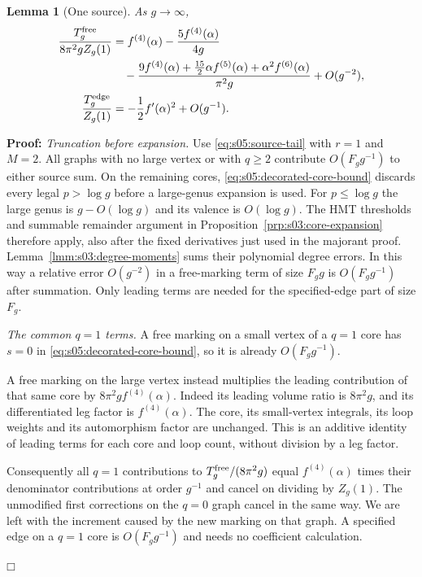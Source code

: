 \documentclass[a4paper,10pt]{article}
\numberwithin{equation}{section}
\theoremstyle{paperplain}
\newtheorem{lmm}[thm]{Lemma}
\theoremstyle{paperremark}
\theoremstyle{paperplain}
\newenvironment{prf}{\noindent \textbf{Proof: }}{\hfill $\mdlgwhtsquare$\par\addvspace{0.5\baselineskip}}
\begin{document}
\begin{lmm}[One source]\label{lmm:s05:single-source}
As $g\to\infty$,
\begin{align}
 \frac{T_g^{\rm free}}{8\pi^2gZ_g(1)}
 &=f^{(4)}(\alpha)-\frac{5f^{(4)}(\alpha)}{4g}\notag\\
 &\quad-\frac{9f^{(4)}(\alpha)
          +\tfrac{15}{2}\alpha f^{(5)}(\alpha)
          +\alpha^2 f^{(6)}(\alpha)}{\pi^2g}
          +O(g^{-2}),
 \label{eq:s05:free-ratio}\\
 \frac{T_g^{\rm edge}}{Z_g(1)}
 &=-\frac12 f'(\alpha)^2+O(g^{-1}).
 \label{eq:s05:edge-ratio}
\end{align}
\end{lmm}
\begin{prf}
\emph{Truncation before expansion.}
Use \eqref{eq:s05:source-tail} with $r=1$ and $M=2$.
All graphs with no large vertex or with $q\geq2$ contribute
$O(F_g g^{-1})$ to either source sum. On the remaining cores,
\eqref{eq:s05:decorated-core-bound} discards every legal
$p>\log g$ before a large-genus expansion is used. For
$p\leq\log g$ the large genus is $g-O(\log g)$ and its valence is
$O(\log g)$. The HMT thresholds and summable remainder argument in
Proposition~\ref{prp:s03:core-expansion} therefore apply, also after
the fixed derivatives just used in the majorant proof.
Lemma~\ref{lmm:s03:degree-moments} sums their polynomial degree
errors. In this way a relative error $O(g^{-2})$ in a free-marking
term of size $F_g g$ is $O(F_g g^{-1})$ after summation. Only leading
terms are needed for the specified-edge part of size $F_g$.

\emph{The common $q=1$ terms.}
A free marking on a small vertex of a $q=1$ core has $s=0$ in
\eqref{eq:s05:decorated-core-bound}, so it is already
$O(F_g g^{-1})$.

A free marking on the large vertex instead
multiplies the leading contribution of that same core by
$8\pi^2g f^{(4)}(\alpha)$. Indeed its leading volume ratio is
$8\pi^2g$, and its differentiated leg factor is
$f^{(4)}(\alpha)$. The core, its small-vertex integrals, its
loop weights and its automorphism factor are unchanged.
This is an additive identity of leading terms for each core and
loop count, without division by a leg factor.

Consequently all $q=1$ contributions to $T_g^{\rm free}/(8\pi^2g)$ equal
$f^{(4)}(\alpha)$ times their denominator contributions at order
$g^{-1}$ and cancel on dividing by $Z_g(1)$. The unmodified
first corrections on the $q=0$ graph cancel in the same way.
We are left with the increment caused by the new marking on that
graph. A specified edge on a $q=1$ core is
$O(F_g g^{-1})$ and needs no coefficient calculation.


\end{prf}
\end{document}
